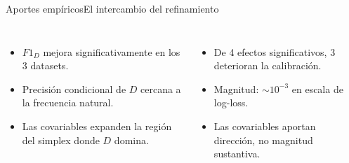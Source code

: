 \documentclass[aspectratio=169,11pt]{beamer}
\begin{document}
\begin{frame}{Aportes emp\'iricos}{El intercambio del refinamiento}
	\begin{columns}[T,onlytextwidth]
		\par\vskip 2mm
		\footnotesize
		\begin{itemize}
			\item $F1_D$ mejora significativamente en los 3 datasets.
			\item Precisi\'on condicional de $D$ cercana a la frecuencia natural.
			\item Las covariables expanden la regi\'on del simplex donde $D$ domina.
		\end{itemize}
		\par\vskip 2mm
		\footnotesize
		\begin{itemize}
			\item De 4 efectos significativos, 3 deterioran la calibraci\'on.
			\item Magnitud: $\sim 10^{-3}$ en escala de log-loss.
			\item Las covariables aportan direcci\'on, no magnitud sustantiva.
		\end{itemize}
	\end{columns}
\end{frame}

\end{document}
